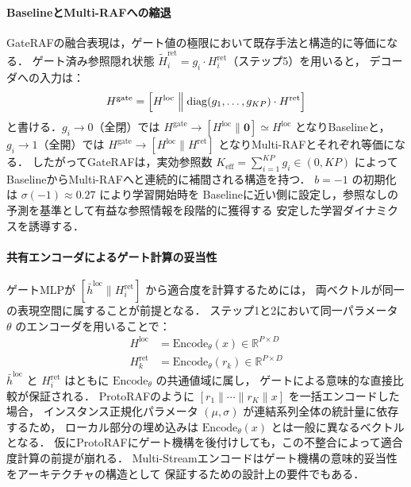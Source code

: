\documentclass[twocolumn, lastpage]{jarticle}
\begin{document}
\paragraph{BaselineとMulti-RAFへの縮退}
GateRAFの融合表現は，ゲート値の極限において既存手法と構造的に等価になる．
ゲート済み参照隠れ状態 $\tilde{H}^{\mathrm{ret}}_i = g_i \cdot H^{\mathrm{ret}}_i$（ステップ5）を用いると，
デコーダへの入力は：
\begin{equation}
    H^{\mathrm{gate}} = \Bigl[H^{\mathrm{loc}} \;\Big\|\;
    \mathrm{diag}(g_1, \ldots, g_{KP}) \cdot H^{\mathrm{ret}}\Bigr]
\end{equation}
と書ける．$g_i \to 0$（全閉）では $H^{\mathrm{gate}} \to [H^{\mathrm{loc}} \| \mathbf{0}] \simeq H^{\mathrm{loc}}$
となりBaselineと，$g_i \to 1$（全開）では
$H^{\mathrm{gate}} \to [H^{\mathrm{loc}} \| H^{\mathrm{ret}}]$ となりMulti-RAFとそれぞれ等価になる．
したがってGateRAFは，実効参照数 $K_{\mathrm{eff}} = \sum_{i=1}^{KP} g_i \in (0, KP)$ によって
BaselineからMulti-RAFへと連続的に補間される構造を持つ．
$b = -1$ の初期化は $\sigma(-1) \approx 0.27$ により学習開始時を
Baselineに近い側に設定し，参照なしの予測を基準として有益な参照情報を段階的に獲得する
安定した学習ダイナミクスを誘導する．

\paragraph{共有エンコーダによるゲート計算の妥当性}
ゲートMLPが $[\bar{h}^{\mathrm{loc}} \| H^{\mathrm{ret}}_i]$ から適合度を計算するためには，
両ベクトルが同一の表現空間に属することが前提となる．
ステップ1と2において同一パラメータ $\theta$ のエンコーダを用いることで：
\begin{align}
    H^{\mathrm{loc}} &= \mathrm{Encode}_\theta(x) \in \mathbb{R}^{P \times D} \\
    H^{\mathrm{ret}}_k &= \mathrm{Encode}_\theta(r_k) \in \mathbb{R}^{P \times D}
\end{align}
$\bar{h}^{\mathrm{loc}}$ と $H^{\mathrm{ret}}_i$ はともに $\mathrm{Encode}_\theta$ の共通値域に属し，
ゲートによる意味的な直接比較が保証される．
ProtoRAFのように $[r_1 \| \cdots \| r_K \| x]$ を一括エンコードした場合，
インスタンス正規化パラメータ $(\mu, \sigma)$ が連結系列全体の統計量に依存するため，
ローカル部分の埋め込みは $\mathrm{Encode}_\theta(x)$ とは一般に異なるベクトルとなる．
仮にProtoRAFにゲート機構を後付けしても，この不整合によって適合度計算の前提が崩れる．
Multi-Streamエンコードはゲート機構の意味的妥当性をアーキテクチャの構造として
保証するための設計上の要件でもある．
\end{document}
